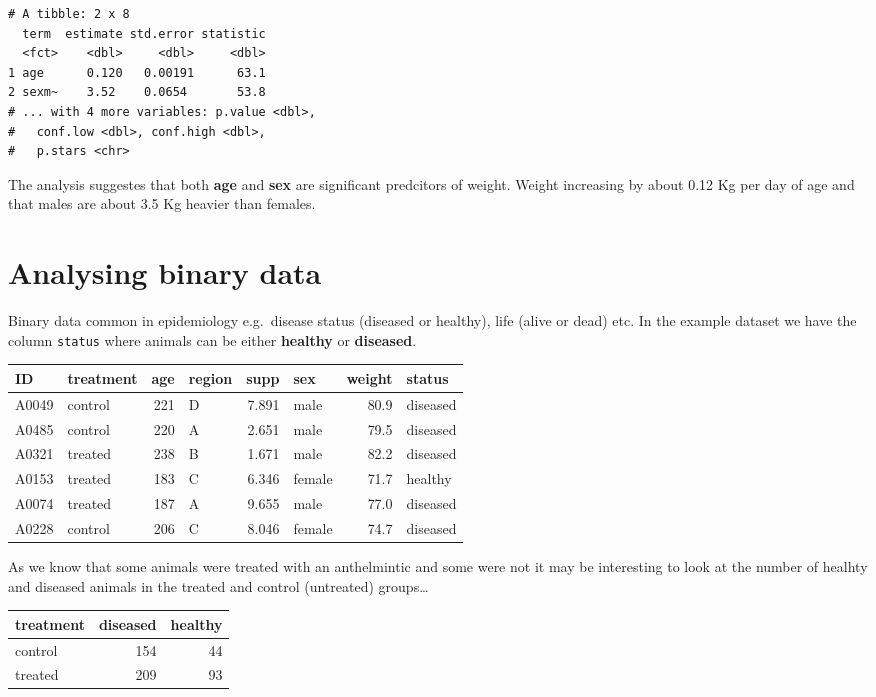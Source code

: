 \documentclass[]{tufte-handout}
\begin{document}
\begin{verbatim}
# A tibble: 2 x 8
  term  estimate std.error statistic
  <fct>    <dbl>     <dbl>     <dbl>
1 age      0.120   0.00191      63.1
2 sexm~    3.52    0.0654       53.8
# ... with 4 more variables: p.value <dbl>,
#   conf.low <dbl>, conf.high <dbl>,
#   p.stars <chr>
\end{verbatim}

The analysis suggestes that both \textbf{age} and \textbf{sex} are
significant predcitors of weight. Weight increasing by about 0.12 Kg per
day of age and that males are about 3.5 Kg heavier than females.

\newpage

\hypertarget{analysing-binary-data}{%
\section{Analysing binary data}\label{analysing-binary-data}}

Binary data common in epidemiology e.g.~disease status (diseased or
healthy), life (alive or dead) etc. In the example dataset we have the
column \texttt{status} where animals can be either \textbf{healthy} or
\textbf{diseased}.

\begin{tabular}{l|l|r|l|r|l|r|l}
\hline
ID & treatment & age & region & supp & sex & weight & status\\
\hline
A0049 & control & 221 & D & 7.891 & male & 80.9 & diseased\\
\hline
A0485 & control & 220 & A & 2.651 & male & 79.5 & diseased\\
\hline
A0321 & treated & 238 & B & 1.671 & male & 82.2 & diseased\\
\hline
A0153 & treated & 183 & C & 6.346 & female & 71.7 & healthy\\
\hline
A0074 & treated & 187 & A & 9.655 & male & 77.0 & diseased\\
\hline
A0228 & control & 206 & C & 8.046 & female & 74.7 & diseased\\
\hline
\end{tabular}

As we know that some animals were treated with an anthelmintic and some
were not it may be interesting to look at the number of healhty and
diseased animals in the treated and control (untreated) groups\ldots{}

\begin{tabular}{l|r|r}
\hline
treatment & diseased & healthy\\
\hline
control & 154 & 44\\
\hline
treated & 209 & 93\\
\hline
\end{tabular}
\end{document}
